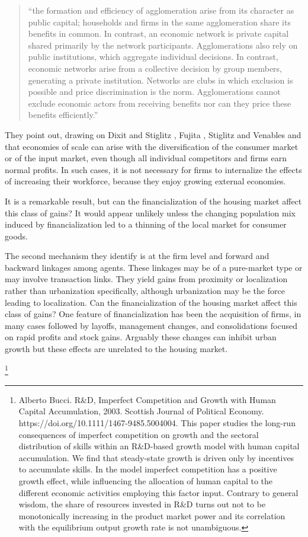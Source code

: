 \begin{quotation}
``the formation and efficiency of agglomeration arise from its character as public capital; households and firms in the same agglomeration share its benefits in common. In contrast, an economic network is private capital shared primarily by the network participants. Agglomerations also rely on public institutions, which aggregate individual decisions. In contrast, economic networks arise from a collective decision by group members, generating a private institution. Networks are clubs in which exclusion is possible and price discrimination is the norm. Agglomerations cannot exclude economic actors from receiving benefits nor can they price these benefits efficiently.''
\end{quotation}
They point out, drawing on Dixit and Stiglitz \cite{AvinashK.Dixit1977MCaO},  Fujita \cite{fujitaMonopolisticCompetitionModel1988}, Stiglitz and Venables and \cite{fujitaSpatialEconomyCities1999} that economies of scale  can arise with the diversification of the consumer market or of the input market, even though all individual competitors and firms earn normal profits. In such cases, it is not necessary for firms to internalize the effects of increasing their workforce, because they enjoy growing external economies.

 It is a remarkable result, but can the financialization of the housing market affect this class of  gains? It would appear unlikely unless the changing population mix induced by financialization led to a thinning of the local market for consumer goods. 

 The second mechanism they identify is at the firm level and forward and backward linkages among agents. These linkages may be of a pure-market type or may involve transaction links. They yield gains from proximity or localization rather than urbanization specifically, although urbanization may be the force leading to localization. Can the financialization of the housing market affect this class of gains? One feature of financialization has been the acquisition of firms, in many cases followed by layoffs, management changes, and consolidations focused on rapid profits and stock gains. Arguably these changes can inhibit urban growth but these effects are unrelated to the housing market.

 \footnote{Alberto Bucci.  R\&D, Imperfect Competition and Growth with Human Capital Accumulation, 2003. Scottish Journal of Political Economy. https://doi.org/10.1111/1467-9485.5004004. This paper studies the long-run consequences of imperfect competition on growth and the sectoral distribution of skills within an R\&D-based growth model with human capital accumulation. We find that steady-state growth is driven only by incentives to accumulate skills. In the model imperfect competition has a positive growth effect, while influencing the allocation of human capital to the different economic activities employing this factor input. Contrary to general wisdom, the share of resources invested in R\&D turns out not to be monotonically increasing in the product market power and its correlation with the equilibrium output growth rate is not unambiguous.}

